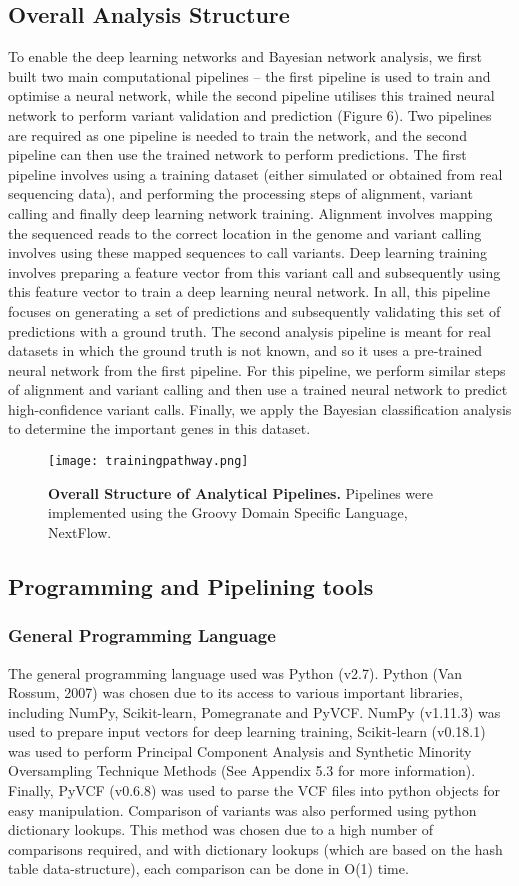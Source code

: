 \documentclass{article}
\begin{document}
\subsection{Overall Analysis Structure}
To enable the deep learning networks and Bayesian network analysis, we first built two main computational pipelines -- the first pipeline is used to train and optimise a neural network, while the second pipeline utilises this  trained neural network to perform variant validation and prediction (Figure 6). Two pipelines are required as one pipeline is needed to train the network, and the second pipeline can then use the trained network to perform predictions. The first pipeline involves using a training dataset (either simulated or obtained from real sequencing data), and performing the processing steps of alignment, variant calling and finally deep learning network training. Alignment involves mapping the sequenced reads to the correct location in the genome and variant calling involves using these mapped sequences to call variants. Deep learning training involves preparing a feature vector from this variant call and subsequently using this feature vector to train a deep learning neural network. In all, this pipeline focuses on generating a set of predictions and subsequently validating this set of predictions with a ground truth. The second analysis pipeline is meant for real datasets in which the ground truth is not known, and so it uses a pre-trained neural network from the first pipeline. For this pipeline, we perform similar steps of alignment and variant calling and then use a trained neural network to predict high-confidence variant calls. Finally, we apply the Bayesian classification analysis to determine the important genes in this dataset.

\begin{figure}[H]
\texttt{[image: trainingpathway.png]}
\centering
\caption{\textbf{Overall Structure of Analytical Pipelines.} Pipelines were implemented using the Groovy Domain Specific Language, NextFlow.}
\end{figure}

\subsection{Programming and Pipelining tools}
\subsubsection{General Programming Language}
The general programming language used was Python (v2.7). Python (Van Rossum, 2007) was chosen due to its access to various important libraries, including NumPy, Scikit-learn, Pomegranate and PyVCF. NumPy (v1.11.3) was used to prepare input vectors for deep learning training, Scikit-learn (v0.18.1) was used to perform Principal Component Analysis and Synthetic Minority Oversampling Technique Methods (See Appendix 5.3 for more information). Finally, PyVCF (v0.6.8) was used to parse the VCF files into python objects for easy manipulation. Comparison of variants was also performed using python dictionary lookups. This method was chosen due to a high number of comparisons required, and with dictionary lookups (which are based on the hash table data-structure), each comparison can be done in O(1) time.
\end{document}
